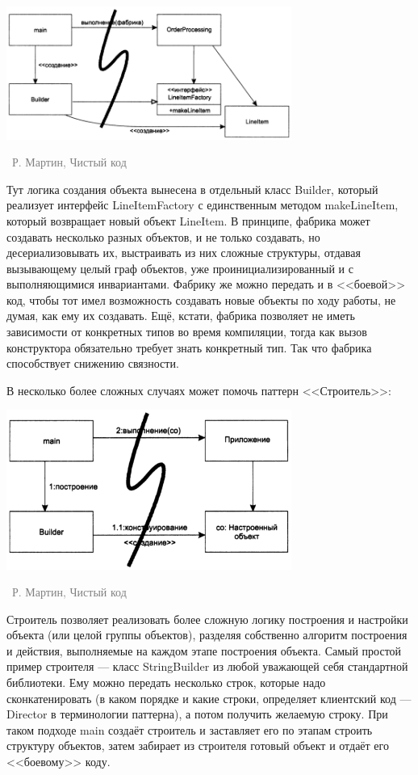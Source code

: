 \documentclass[a5paper]{article}
\newcommand{\attribution}[1] {
\vspace{-5mm}\begin{flushright}\begin{scriptsize}\textcolor{gray}{\textcopyright\, #1}\end{scriptsize}\end{flushright}
}
\begin{document}
\begin{center}
    \includegraphics[width=0.7\textwidth]{factory.png}
    \attribution{Р. Мартин, Чистый код}
\end{center}

Тут логика создания объекта вынесена в отдельный класс Builder, который реализует интерфейс LineItemFactory с единственным методом makeLineItem, который возвращает новый объект LineItem. В принципе, фабрика может создавать несколько разных объектов, и не только создавать, но десериализовывать их, выстраивать из них сложные структуры, отдавая вызывающему целый граф объектов, уже проинициализированный и с выполняющимися инвариантами. Фабрику же можно передать и в <<боевой>> код, чтобы тот имел возможность создавать новые объекты по ходу работы, не думая, как ему их создавать. Ещё, кстати, фабрика позволяет не иметь зависимости от конкретных типов во время компиляции, тогда как вызов конструктора обязательно требует знать конкретный тип. Так что фабрика способствует снижению связности.

В несколько более сложных случаях может помочь паттерн <<Строитель>>:

\begin{center}
    \includegraphics[width=0.7\textwidth]{builder.png}
    \attribution{Р. Мартин, Чистый код}
\end{center}

Строитель позволяет реализовать более сложную логику построения и настройки объекта (или целой группы объектов), разделяя собственно алгоритм построения и действия, выполняемые на каждом этапе построения объекта. Самый простой пример строителя --- класс StringBuilder из любой уважающей себя стандартной библиотеки. Ему можно передать несколько строк, которые надо сконкатенировать (в каком порядке и какие строки, определяет клиентский код --- Director в терминологии паттерна), а потом получить желаемую строку. При таком подходе main создаёт строитель и заставляет его по этапам строить структуру объектов, затем забирает из строителя готовый объект и отдаёт его <<боевому>> коду.
\end{document}

